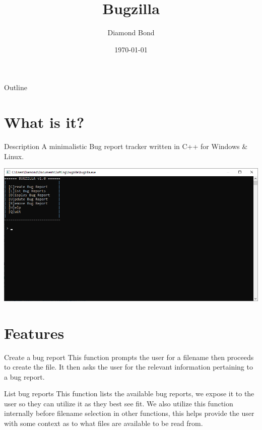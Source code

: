 \documentclass[bigger]{beamer}
\author{Diamond Bond}
\date{\today}
\title{Bugzilla}
\begin{document}
\maketitle
\begin{frame}{Outline}
\tableofcontents
\end{frame}


\section{What is it?}
\label{sec:orge29e877}
\begin{frame}[label={sec:orgc23cd51}]{Description}
A minimalistic Bug report tracker written in C++ for Windows \& Linux.

\begin{center}
\includegraphics[width=.9\linewidth]{../img/mainmenu.png}
\end{center}
\end{frame}

\section{Features}
\label{sec:org657c50b}

\begin{frame}[label={sec:org1cf137d}]{Create a bug report}
This function prompts the user for a filename then proceeds to create the file.
It then asks the user for the relevant information pertaining to a bug report.
\end{frame}

\begin{frame}[label={sec:org151c09c}]{List bug reports}
This function lists the available bug reports, we expose it to the user so they can utilize it as they best see fit.
We also utilize this function internally before filename selection in other functions, this helps provide the user with some context as to what files are available to be read from.
\end{frame}
\end{document}
